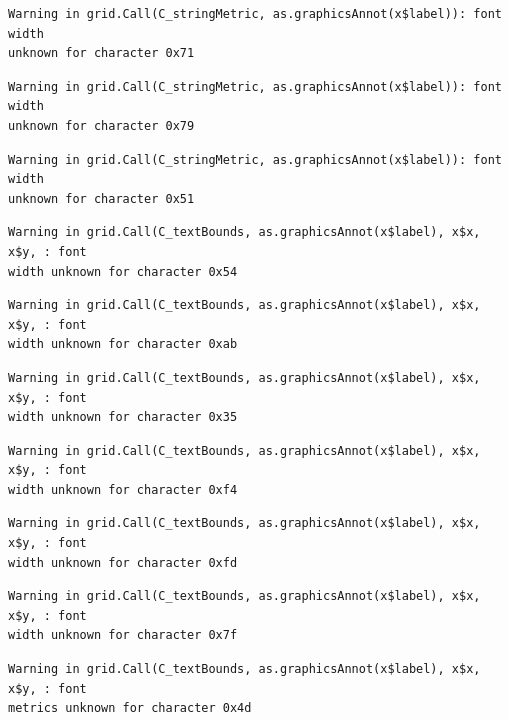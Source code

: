 \documentclass[
  letterpaper,
  DIV=11,
  numbers=noendperiod]{scrreprt}
\begin{document}
\begin{verbatim}
Warning in grid.Call(C_stringMetric, as.graphicsAnnot(x$label)): font width
unknown for character 0x71
\end{verbatim}

\begin{verbatim}
Warning in grid.Call(C_stringMetric, as.graphicsAnnot(x$label)): font width
unknown for character 0x79
\end{verbatim}

\begin{verbatim}
Warning in grid.Call(C_stringMetric, as.graphicsAnnot(x$label)): font width
unknown for character 0x51
\end{verbatim}

\begin{verbatim}
Warning in grid.Call(C_textBounds, as.graphicsAnnot(x$label), x$x, x$y, : font
width unknown for character 0x54
\end{verbatim}

\begin{verbatim}
Warning in grid.Call(C_textBounds, as.graphicsAnnot(x$label), x$x, x$y, : font
width unknown for character 0xab
\end{verbatim}

\begin{verbatim}
Warning in grid.Call(C_textBounds, as.graphicsAnnot(x$label), x$x, x$y, : font
width unknown for character 0x35
\end{verbatim}

\begin{verbatim}
Warning in grid.Call(C_textBounds, as.graphicsAnnot(x$label), x$x, x$y, : font
width unknown for character 0xf4
\end{verbatim}

\begin{verbatim}
Warning in grid.Call(C_textBounds, as.graphicsAnnot(x$label), x$x, x$y, : font
width unknown for character 0xfd
\end{verbatim}

\begin{verbatim}
Warning in grid.Call(C_textBounds, as.graphicsAnnot(x$label), x$x, x$y, : font
width unknown for character 0x7f
\end{verbatim}

\begin{verbatim}
Warning in grid.Call(C_textBounds, as.graphicsAnnot(x$label), x$x, x$y, : font
metrics unknown for character 0x4d
\end{verbatim}
\end{document}
